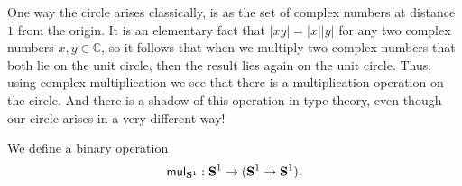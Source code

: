 One way the circle arises classically, is as the set of complex numbers at distance $1$ from the origin. It is an elementary fact that $|xy|=|x||y|$ for any two complex numbers $x,y\in\mathbb{C}$, so it follows that when we multiply two complex numbers that both lie on the unit circle, then the result lies again on the unit circle. Thus, using complex multiplication we see that there is a multiplication operation on the circle. And there is a shadow of this operation in type theory, even though our circle arises in a very different way!

\begin{defn}\label{defn:mul-circle}
  We define a binary operation
\begin{equation*}
  \mathsf{mul}_{\mathbf{S}^{1}} : \mathbf{S}^{1}\to(\mathbf{S}^{1}\to\mathbf{S}^{1}).
\end{equation*}
\end{defn}

